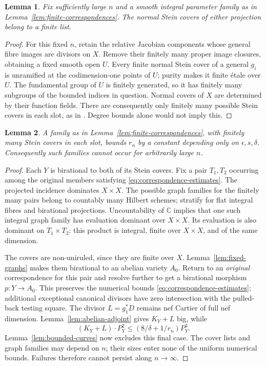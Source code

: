 \documentclass[12pt,a4paper,psamsfonts]{amsart}
\theoremstyle{definition}
\theoremstyle{plain}
\newtheorem{lemma}{Lemma}[section]
\newcommand{\C}{\mathbb C}
\begin{document}
\begin{lemma}\label{lem:finite-stein-covers}
Fix sufficiently large $n$ and a smooth integral parameter family
as in Lemma~\ref{lem:finite-correspondences}. The normal Stein
covers of either projection belong to a finite list.
\end{lemma}
\begin{proof}
For this fixed $n$, retain the relative Jacobian components whose
general fibre images are divisors on $X$. Remove their finitely
many proper image closures, obtaining a fixed smooth open $U$. Every finite normal Stein cover of a
general $g_i$ is unramified at the codimension-one points of $U$;
purity makes it finite \'etale over $U$. The fundamental group of
$U$ is finitely generated, so it has finitely many subgroups of
the bounded indices in question. Normal covers of $X$ are
determined by their function fields. There are consequently only
finitely many possible Stein covers in each slot, as in
\cite[Lemma~7.5]{LA}. Degree bounds alone would not imply this.
\end{proof}

\begin{lemma}\label{lem:bounded-correspondence-exclusion}
A family as in Lemma~\ref{lem:finite-correspondences}, with
finitely many Stein covers in each slot, bounds $r_n$ by a constant
depending only on $\epsilon,s,\delta$. Consequently such families
cannot occur for arbitrarily large $n$.
\end{lemma}
\begin{proof}
Each $Y$ is birational to both of its Stein covers. Fix a pair
$T_1,T_2$ occurring among the original members satisfying
\eqref{eq:correspondence-estimates}. The projected incidence
dominates $X\times X$. The possible graph families for the
finitely many pairs belong to countably many Hilbert schemes;
stratify for flat integral fibres and birational projections.
Uncountability of $\C$ implies that one such integral graph
family has evaluation dominant over $X\times X$. Its evaluation
is also dominant on $T_1\times T_2$: this product is integral,
finite over $X\times X$, and of the same dimension.

The covers are non-uniruled, since they are finite over $X$.
Lemma~\ref{lem:fixed-graphs} makes them birational to an abelian
variety $A_0$. Return to an \emph{original} correspondence for
this pair and resolve further to get a birational morphism
$p:Y\to A_0$. This preserves the numerical bounds
\eqref{eq:correspondence-estimates}; additional exceptional
canonical divisors have zero intersection with the pulled-back
testing square. The divisor $L=g_1^*D$ remains nef Cartier of
full nef dimension. Lemma~\ref{lem:abelian-adjoint} gives
$K_Y+L$ big, while
\[
 (K_Y+L)\cdot P_Y^2\le(8/\delta+1/r_n)P_Y^3.
\]
Lemma~\ref{lem:bounded-curves} now excludes this final case.
The cover lists and graph families may depend on $n$; their
sizes enter none of the uniform numerical bounds. Failures
therefore cannot persist along $n\to\infty$.
\end{proof}
\end{document}
